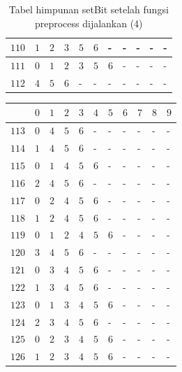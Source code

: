 \begin{appendices}
\begin{table}[H]
\begin{tabular} {|l|l|l|l|l|l|l|l|l|l|l|}
  		$ 110 $ & $ 1 $ &$ 2 $ &$ 3 $ &$ 5 $ &$ 6 $ & - &  - &  - &  - &  -   \\ \hline
  		$ 111 $ & $ 0 $ &$ 1 $ &$ 2 $ &$ 3 $ &$ 5 $ &$ 6 $ & - &  - &  - &  -   \\ \hline
  		$ 112 $ & $ 4 $ &$ 5 $ &$ 6 $ & - &  - &  - &  - &  - &  - &  -   \\ \hline  		
  	\end{tabular}\caption{Tabel himpunan setBit setelah fungsi preprocess dijalankan (4)}
  	\label{tab:setbit_4}
  \end{table}
  \begin{table}[H]
  	\centering
  	\begin{tabular} {|l|l|l|l|l|l|l|l|l|l|l|} \hline
  		\backslashbox{$Num$}{$index$} & $ 0 $ & $ 1 $ & $ 2 $ & $ 3 $ & $ 4 $ & $ 5 $ & $ 6 $ & $ 7 $ & $ 8 $ & $ 9 $ \\ \hline
  		$ 113 $ & $ 0 $ &$ 4 $ &$ 5 $ &$ 6 $ & - &  - &  - &  - &  - &  -   \\ \hline
  		$ 114 $ & $ 1 $ &$ 4 $ &$ 5 $ &$ 6 $ & - &  - &  - &  - &  - &  -   \\ \hline
  		$ 115 $ & $ 0 $ &$ 1 $ &$ 4 $ &$ 5 $ &$ 6 $ & - &  - &  - &  - &  -   \\ \hline
  		$ 116 $ & $ 2 $ &$ 4 $ &$ 5 $ &$ 6 $ & - &  - &  - &  - &  - &  -   \\ \hline
  		$ 117 $ & $ 0 $ &$ 2 $ &$ 4 $ &$ 5 $ &$ 6 $ & - &  - &  - &  - &  -   \\ \hline
  		$ 118 $ & $ 1 $ &$ 2 $ &$ 4 $ &$ 5 $ &$ 6 $ & - &  - &  - &  - &  -   \\ \hline
  		$ 119 $ & $ 0 $ &$ 1 $ &$ 2 $ &$ 4 $ &$ 5 $ &$ 6 $ & - &  - &  - &  -   \\ \hline
  		$ 120 $ & $ 3 $ &$ 4 $ &$ 5 $ &$ 6 $ & - &  - &  - &  - &  - &  -   \\ \hline
  		$ 121 $ & $ 0 $ &$ 3 $ &$ 4 $ &$ 5 $ &$ 6 $ & - &  - &  - &  - &  -   \\ \hline
  		$ 122 $ & $ 1 $ &$ 3 $ &$ 4 $ &$ 5 $ &$ 6 $ & - &  - &  - &  - &  -   \\ \hline
  		$ 123 $ & $ 0 $ &$ 1 $ &$ 3 $ &$ 4 $ &$ 5 $ &$ 6 $ & - &  - &  - &  -   \\ \hline
  		$ 124 $ & $ 2 $ &$ 3 $ &$ 4 $ &$ 5 $ &$ 6 $ & - &  - &  - &  - &  -   \\ \hline
  		$ 125 $ & $ 0 $ &$ 2 $ &$ 3 $ &$ 4 $ &$ 5 $ &$ 6 $ & - &  - &  - &  -   \\ \hline
  		$ 126 $ & $ 1 $ &$ 2 $ &$ 3 $ &$ 4 $ &$ 5 $ &$ 6 $ & - &  - &  - &  -   \\ \hline

\end{tabular}
\end{table}
\end{appendices}
